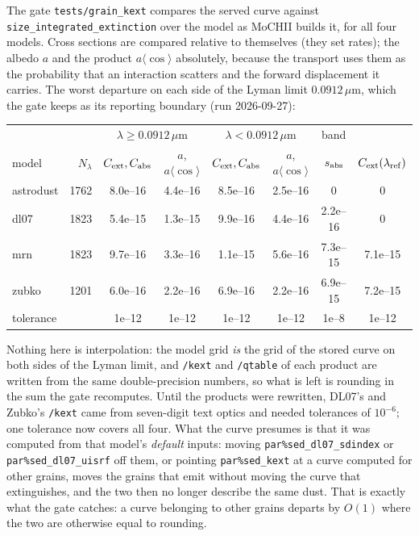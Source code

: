 \documentclass[english,a4paper]{my_memo}
\newcommand{\code}[1]{\texttt{#1}}
\begin{document}
The gate \code{tests/grain\_kext} compares the served curve against
\code{size\_integrated\_extinction} over the model as MoCHII builds it, for
all four models.  Cross sections are compared relative to themselves (they
set rates); the albedo $a$ and the product $a\langle\cos\rangle$
absolutely, because the transport uses them as the probability that an
interaction scatters and the forward displacement it carries.  The worst
departure on each side of the Lyman limit $0.0912\,\mu$m, which the gate
keeps as its reporting boundary (run 2026-09-27):
\begin{center}\small
\begin{tabular}{@{}lrcccccc@{}}
\toprule
 & & \multicolumn{2}{c}{$\lambda \ge 0.0912\,\mu$m}
 & \multicolumn{2}{c}{$\lambda < 0.0912\,\mu$m} & band & \\
model & $N_\lambda$ & $C_{\rm ext}, C_{\rm abs}$ & $a$, $a\langle\cos\rangle$
 & $C_{\rm ext}, C_{\rm abs}$ & $a$, $a\langle\cos\rangle$
 & $s_{\rm abs}$ & $C_{\rm ext}(\lambda_{\rm ref})$ \\
\midrule
astrodust & 1762 & 8.0e--16 & 4.4e--16 & 8.5e--16 & 2.5e--16 & 0       & 0 \\
dl07      & 1823 & 5.4e--15 & 1.3e--15 & 9.9e--16 & 4.4e--16 & 2.2e--16 & 0 \\
mrn       & 1823 & 9.7e--16 & 3.3e--16 & 1.1e--15 & 5.6e--16 & 7.3e--15 & 7.1e--15 \\
zubko     & 1201 & 6.0e--16 & 2.2e--16 & 6.9e--16 & 2.2e--16 & 6.9e--15 & 7.2e--15 \\
\midrule
tolerance & & 1e--12 & 1e--12 & 1e--12 & 1e--12 & 1e--8 & 1e--12 \\
\bottomrule
\end{tabular}
\end{center}
Nothing here is interpolation: the model grid \emph{is} the grid of the
stored curve on both sides of the Lyman limit, and \code{/kext} and
\code{/qtable} of each product are written from the same double-precision
numbers, so what is left is rounding in the sum the gate recomputes.  Until
the products were rewritten, DL07's and Zubko's \code{/kext} came from
seven-digit text optics and needed tolerances of $10^{-6}$; one tolerance
now covers all four.  What the curve presumes is that it was computed from
that model's \emph{default} inputs: moving \code{par\%sed\_dl07\_sdindex} or
\code{par\%sed\_dl07\_uisrf} off them, or pointing \code{par\%sed\_kext} at a
curve computed for other grains, moves the grains that emit without moving
the curve that extinguishes, and the two then no longer describe the same
dust.  That is exactly what the gate catches: a curve belonging to other
grains departs by $O(1)$ where the two are otherwise equal to rounding.
\end{document}
